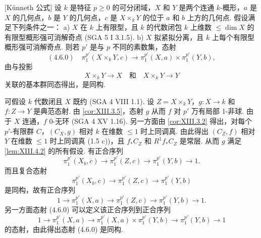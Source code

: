 \begin{proposition}\label{prop:XIII.4.6}
[Künneth 公式] 设 $k$ 是特征 $p \geqslant 0$ 的可分闭域，$X$ 和 $Y$ 是两个连通 $k$-概形，$a$ 是 $X$ 的几何点，$b$ 是 $Y$ 的几何点，$c$ 是 $X \times_k Y$ 的位于 $a$ 和 $b$ 上方的几何点. 假设满足下列条件之一：
a) $X$ 在 $k$ 上有限型，且 $k$ 的代数闭包 $k$ 上维数 $\leqslant \dim X$ 的有限型概形强可消解奇点 (SGA 5 I 3.1.5).
b) $X$ 拟紧拟分离，且 $k$ 上每个有限型概形强可消解奇点.
则若 $p'$ 是与 $p$ 不同的素数集，态射
\[
(4.6.0) \quad \pi^{p'}_1(X \times_k Y, c) \longrightarrow \pi^{p'}_1(X, a) \times \pi^{p'}_1(Y, b),
\]
由与投影
\[
X \times_k Y \longrightarrow X \quad \text{和} \quad X \times_k Y \longrightarrow Y
\]
关联的基本群同态得出，是同构.
\end{proposition}

可假设 $k$ 代数闭且 $X$ 既约 (SGA 4 VIII 1.1). 设 $Z = X \times_k Y$，$g \colon X \to k$ 和 $f \colon Z \to Y$ 是典范态射. 由 \ref{cor:XIII.3.5}，态射 $g$ 从而 $f$ 对 $p'$ 万有局部 1-非球. 由于 $X$ 连通，$f$ 0-无环 (SGA 4 XV 1.16). 另一方面由 \ref{cor:XIII.3.2} 得出，对每个 $p'$-有限群 $C$，$(C_X, g)$ 相对 $k$ 在维数 $\leqslant 1$ 时上同调真. 由此得出 $(C_Z, f)$ 相对 $Y$ 在维数 $\leqslant 1$ 时上同调真 (1.5 c))，且 $f_* C_Z$ 和 $R^1 f_* C_Z$ 是常层. 从而 $g$ 满足 \ref{lem:XIII.4.2} 的所有假设. 有正合序列
\[
\pi^{p'}_1(X_b, c) \longrightarrow \pi^{p'}_1(Z, c) \longrightarrow \pi^{p'}_1(Y, b) \longrightarrow 1.
\]
而且复合态射
\[
\pi^{p'}_1(X_b, c) \longrightarrow \pi^{p'}_1(Z, c) \longrightarrow \pi^{p'}_1(Y, b)
\]
是同构，故有正合序列
\[
1 \longrightarrow \pi^{p'}_1(X, a) \longrightarrow \pi^{p'}_1(Z, c) \longrightarrow \pi^{p'}_1(Y, b) \longrightarrow 1.
\]
另一方面态射 (4.6.0) 可以定义该正合序列到正合序列
\[
1 \longrightarrow \pi^{p'}_1(X, a) \longrightarrow \pi^{p'}_1(X, a) \times \pi^{p'}_1(Y, b) \longrightarrow \pi^{p'}_1(Y, b) \longrightarrow 1
\]
的态射，由此得出态射 (4.6.0) 是同构.

